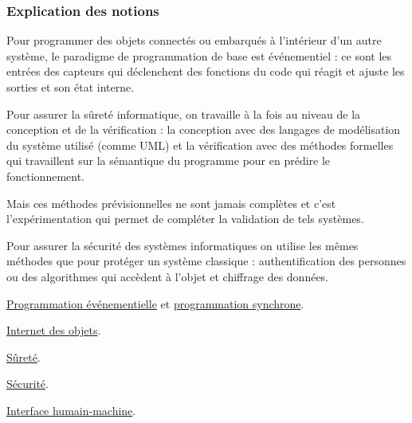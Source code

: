 \subsubsection[Explication des notions]{Explication des notions}
\label{subsub:VIII.3.1.3}


\begin{jazzitemize}
\item Pour programmer des objets connectés ou embarqués à l'intérieur d'un autre système, le paradigme de programmation de base est événementiel : ce sont les entrées des capteurs qui déclenchent des fonctions du code qui réagit et ajuste les sorties et son état interne.
\item Pour assurer la sûreté informatique, on travaille à la fois au niveau de la conception et de la vérification : la conception avec des langages de modélisation du système utilisé (comme UML)  et la vérification avec des méthodes formelles  qui travaillent sur la sémantique du programme pour en prédire le fonctionnement.
\item Mais ces méthodes prévisionnelles ne sont jamais complètes et c'est l'expérimentation qui permet de compléter la validation de tels systèmes. 
\item Pour assurer la sécurité des systèmes informatiques on utilise les mêmes méthodes que pour protéger un système classique : authentification des personnes ou des algorithmes qui accèdent à l'objet et chiffrage des données.
\end{jazzitemize}


\begin{jazzitemize}
\item \href{https://fr.wikipedia.org/wiki/Programmation_\%C3\%A9v\%C3\%A9nementielle}{Programmation événementielle} et \href{https://fr.wikipedia.org/wiki/Programmation_synchrone}{programmation synchrone}.
\item \href{https://fr.wikipedia.org/wiki/Internet_des_objets}{Internet des objets}.
\item \href{https://fr.wikipedia.org/wiki/S\%C3\%BBret\%C3\%A9_de_fonctionnement_des_syst\%C3\%A8mes_informatiques}{Sûreté}. 
\item \href{https://fr.wikipedia.org/wiki/S\%C3\%A9curit\%C3\%A9_des_syst\%C3\%A8mes_d'information}{Sécurité}.
\item \href{https://fr.wikipedia.org/wiki/Interactions_homme-machine}{Interface humain-machine}.
\end{jazzitemize}

